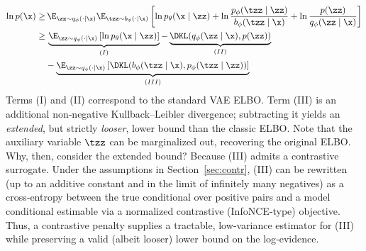 \begin{equation}
    \begin{split}
        \ln{p(\x)}
        \geq & \,
        \E_{\zz \sim q_{\phi}(\cdot \mid \x)} \E_{\tzz \sim  b_{\phi}(\cdot \mid \x)}
        \left[
            \ln p_{\theta}(\x \mid \zz) +
            \ln \frac{p_{\phi}(\tzz \mid \zz)}{b_{\phi}(\tzz \mid \x)} +
            \ln \frac{p(\zz)}{q_{\phi}(\zz \mid \x)}
            \right] \\
        \geq & \,
        \underbrace{
            \E_{\zz \sim q_{\phi}(\cdot \mid \x)}
            \left[
                \ln p_{\theta}(\x \mid \zz)
                \right]
        }_{(I)}
        -
        \underbrace{
            \DKL (q_{\phi}(\zz \mid \x), p(\zz))
        }_{(II)}
        \\
        &
        -
        \underbrace{
            \E_{\zz \sim q_{\phi}(\cdot \mid \x)}
            \left[
                \DKL(b_{\phi}(\tzz \mid \x), p_{\phi}(\tzz \mid \zz))
                \right]
        }_{(III)}
        \\
    \end{split}
\end{equation}
Terms (I) and (II) correspond to the standard VAE ELBO. Term (III) is an additional non‑negative Kullback–Leibler divergence; subtracting it yields an \emph{extended}, but strictly \emph{looser}, lower bound than the classic ELBO. Note that the auxiliary variable $\tzz$ can be marginalized out, recovering the original ELBO. Why, then, consider the extended bound?
Because (III) admits a contrastive surrogate. Under the assumptions in Section~\ref{sec:contr}, (III) can be rewritten (up to an additive constant and in the limit of infinitely many negatives) as a cross‑entropy between the true conditional over positive pairs and a model conditional estimable via a normalized contrastive (InfoNCE‑type) objective. Thus, a contrastive penalty supplies a tractable, low‑variance estimator for (III) while preserving a valid (albeit looser) lower bound on the log‑evidence.

